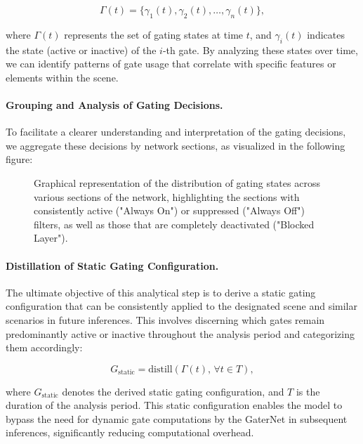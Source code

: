 \begin{equation}
\Gamma(t) = \{\gamma_{1}(t), \gamma_{2}(t), \ldots, \gamma_{n}(t)\},
\label{eq:gating_states_time}
\end{equation}

where \(\Gamma(t)\) represents the set of gating states at time \(t\), and \(\gamma_{i}(t)\) indicates the state (active or inactive) of the \(i\)-th gate. By analyzing these states over time, we can identify patterns of gate usage that correlate with specific features or elements within the scene.

\paragraph{Grouping and Analysis of Gating Decisions.} To facilitate a clearer understanding and interpretation of the gating decisions, we aggregate these decisions by network sections, as visualized in the following figure:

\begin{figure}[htbp]
\centering

\caption{Graphical representation of the distribution of gating states across various sections of the network, highlighting the sections with consistently active ("Always On") or suppressed ("Always Off") filters, as well as those that are completely deactivated ("Blocked Layer").}
\label{fig:gating_analysis}
\end{figure}

\paragraph{Distillation of Static Gating Configuration.} The ultimate objective of this analytical step is to derive a static gating configuration that can be consistently applied to the designated scene and similar scenarios in future inferences. This involves discerning which gates remain predominantly active or inactive throughout the analysis period and categorizing them accordingly:

\begin{equation}
G_{\text{static}} = \text{distill}(\Gamma(t), \, \forall t \in T),
\label{eq:static_gating_configuration}
\end{equation}

where \(G_{\text{static}}\) denotes the derived static gating configuration, and \(T\) is the duration of the analysis period. This static configuration enables the model to bypass the need for dynamic gate computations by the GaterNet in subsequent inferences, significantly reducing computational overhead.

